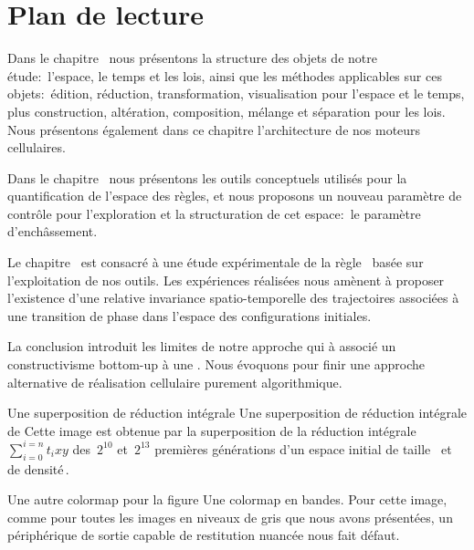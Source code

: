\section{Plan de lecture}

Dans le chapitre~ nous présentons la
structure des objets de notre étude:~l'espace, le temps et les lois, %
ainsi que les méthodes applicables sur ces objets:~édition, réduction,
transformation, visualisation pour l'espace et le temps, plus
construction, altération, composition, mélange et séparation pour les
lois. %
Nous présentons également dans ce chapitre l'architecture de nos
moteurs cellulaires. %

Dans le chapitre~ nous présentons les outils
conceptuels utilisés pour la quantification de l'espace des règles, et
nous proposons un nouveau paramètre de contrôle pour l'exploration et
la structuration de cet espace:~le paramètre d'enchâssement. %

Le chapitre~ est consacré à une étude
expérimentale de la règle~ basée sur l'exploitation de
nos outils. %
Les expériences réalisées nous amènent à proposer l'existence d'une
relative invariance spatio-temporelle des trajec\-toires associées à
une transition de phase dans l'espace des configurations initiales. %

La conclusion introduit les limites de notre approche qui à associé
un constructivisme bottom-up à une . %
Nous évoquons pour finir une approche alternative de réalisation
cellulaire purement algorithmique. %

%
{Une superposition de réduction intégrale}%
{Une superposition de réduction intégrale de }%
{Cette image est obtenue par la superposition de la réduction intégrale
  $\sum_{i=0}^{i=n}t_{i}xy$ des~$2^{10}$ et~$2^{13}$ premières
  générations d'un espace initial de taille~ et de
  densité\,\Sundemi.}

%
{}%
{Une autre colormap pour la figure
  \protect{}}%
{Une colormap en bandes. %
  Pour cette image, comme pour toutes les images en niveaux de gris
  que nous avons présentées, un périphérique de sortie capable de
  restitution nuancée nous fait défaut.}

